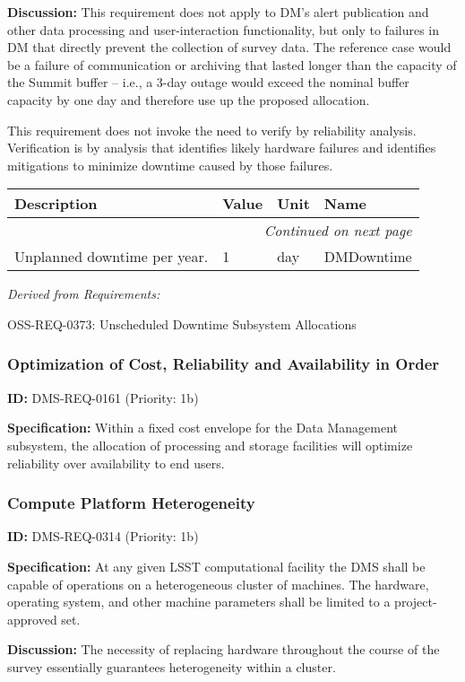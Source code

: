\documentclass[SE,toc,lsstdraft]{lsstdoc}
\makeatletter
\newcommand{\paramname}[1]{\hspace{0pt}#1}
\newcommand{\unitname}[1]{\hspace{0pt}#1}
\newenvironment{parameters}[0]{%
\setlength\LTleft{0pt}
\setlength\LTright{\fill}
\begin{small}
\begin{longtable}[]{|p{0.49\textwidth}|l|p{0.6in}|p{1.70in}@{}|}

\hline \textbf{Description} & \textbf{Value} & \textbf{Unit} & \textbf{Name} \\ \hline
\endhead

\hline \multicolumn{4}{r}{\emph{Continued on next page}} \\
\endfoot

\hline\hline
\endlastfoot
}{%
\hline
\end{longtable}
\end{small}
}
\makeatother
\begin{document}
\textbf{Discussion:} This requirement does not apply to DM's alert publication and other data processing and user-interaction functionality, but only to failures in DM that directly prevent the collection of survey data. The reference case would be a failure of communication or archiving that lasted longer than the capacity of the Summit buffer -- i.e., a 3-day outage would exceed the nominal buffer capacity by one day and therefore use up the proposed allocation.

This requirement does not invoke the need to verify by reliability analysis. Verification is by analysis that identifies likely hardware failures and identifies mitigations to minimize downtime caused by those failures.

\begin{parameters}
Unplanned downtime per year.
&
1
&
\unitname{%
day
}
&
\paramname{%
DMDowntime
} \\\hline
\end{parameters}

\emph{Derived from Requirements:}

OSS-REQ-0373:
Unscheduled Downtime Subsystem Allocations \newline

\subsubsection{Optimization of Cost, Reliability and Availability in Order}

\label{DMS-REQ-0161}
\textbf{ID:} DMS-REQ-0161 (Priority: 1b)

\textbf{Specification:} Within a fixed cost envelope for the Data Management subsystem, the allocation of processing and storage facilities will optimize reliability over availability to end users.

\subsubsection{Compute Platform Heterogeneity}

\label{DMS-REQ-0314}
\textbf{ID:} DMS-REQ-0314 (Priority: 1b)

\textbf{Specification:} At any given LSST computational facility the DMS shall be capable of operations on a heterogeneous cluster of machines. The hardware, operating system, and other machine parameters shall be limited to a project-approved set.

\textbf{Discussion: }The necessity of replacing hardware throughout the course of the survey essentially guarantees heterogeneity within a cluster.
\end{document}
